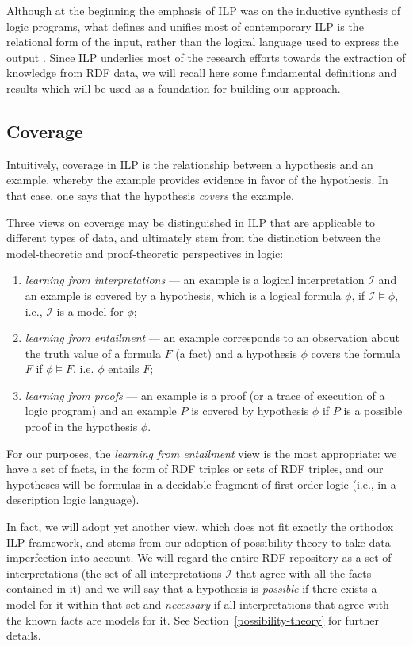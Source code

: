 \documentclass[a4paper]{article}
\newcounter{ex}
\begin{document}
Although at the beginning the emphasis of ILP was on the inductive synthesis of logic programs,
what defines and unifies most of contemporary ILP is the relational form of the input,
rather than the logical language used to express the output \cite{ILPat20}.
Since ILP underlies most of the research efforts towards the extraction of knowledge from
RDF data, we will recall here some fundamental definitions and results which will be used
as a foundation for building our approach.

\subsection{Coverage}

Intuitively, coverage in ILP is the relationship between a hypothesis and an example,
whereby the example provides evidence in favor of the hypothesis. In that case,
one says that the hypothesis \emph{covers} the example.

Three views on coverage may be distinguished in ILP that are applicable to different
types of data, and ultimately stem from the distinction between the model-theoretic and
proof-theoretic perspectives in logic:
\begin{enumerate}
\item \emph{learning from interpretations} ---
  an example is a logical interpretation $\mathcal{I}$ and an example is covered
  by a hypothesis, which is a logical formula $\phi$, if $\mathcal{I} \models \phi$,
  i.e., $\mathcal{I}$ is a model for $\phi$;
\item \emph{learning from entailment} ---
  an example corresponds to an observation about the truth value of a formula $F$ (a fact)
  and a hypothesis $\phi$ covers the formula $F$ if $\phi \models F$,
  i.e. $\phi$ entails $F$;
\item \emph{learning from proofs} ---
  an example is a proof (or a trace of execution of a logic program)
  and an example $P$ is covered by hypothesis $\phi$ if $P$ is
  a possible proof in the hypothesis $\phi$.
\end{enumerate}
For our purposes, the \emph{learning from entailment} view is the most appropriate:
we have a set of facts, in the form of RDF triples or sets of RDF triples,
and our hypotheses will be formulas in a decidable fragment of first-order logic
(i.e., in a description logic language).

In fact, we will adopt yet another view, which does not fit exactly the orthodox ILP
framework, and stems from our adoption of possibility theory to take data imperfection
into account. We will regard the entire RDF repository as a set of interpretations
(the set of all interpretations $\mathcal{I}$ that agree with all the facts contained in it)
and we will say that a hypothesis is \emph{possible} if there exists a model for it within
that set and \emph{necessary} if all interpretations that agree with the known facts
are models for it. See Section~\ref{possibility-theory} for further details.
\end{document}
